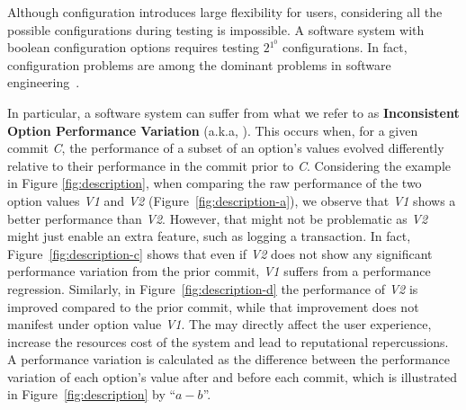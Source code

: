 Although configuration introduces large flexibility for users, considering all the possible configurations during testing is impossible. A software system with  boolean configuration options requires testing $2{^1^0}$ configurations. In fact, configuration problems are among the dominant %
problems in software engineering~\cite{tse,RN2897}.

In particular, a software system can suffer from what we refer to as \textbf{Inconsistent Option Performance Variation} (a.k.a, \inconsistent). This occurs when, for a given commit \emph{C}, the performance of a subset of an option's values evolved differently relative to their performance in the commit prior to \emph{C}. Considering the example in Figure \ref{fig:description}, when comparing the raw performance of the two option values \emph{V1} and \emph{V2} (Figure~\ref{fig:description-a}), we observe that \emph{V1} shows a better performance than \emph{V2}. However, that might not be problematic as \emph{V2} might just enable an extra feature, such as logging a transaction. In fact, Figure~\ref{fig:description-c} shows that even if \emph{V2} does not show any significant performance variation from the prior commit, \emph{V1} suffers from a performance regression.  
Similarly, in Figure~\ref{fig:description-d} the performance of \emph{V2} is improved compared to the prior commit, while that improvement does not manifest under option value \emph{V1}. The \inconsistent may directly affect the user experience, increase the resources cost of the system and lead to reputational repercussions. %
A performance variation is calculated as the difference between the performance variation of each option's value after and before each commit, which is illustrated in Figure~\ref{fig:description} by ``$a - b$''.


